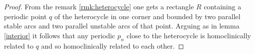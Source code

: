 \documentclass[a4paper,11pt]{article}
\theoremstyle{definition}
\newtheorem{definition}[lemma]{Definition}
\def\la{\lambda}
\begin{document}
\begin{proof} From the remark \ref{rmk:heterocycle} one gets  a rectangle $R$  containing a periodic point $q$ of the heterocycle in one corner and bounded by two parallel stable arcs and two parallel unstable arcs of that point. Arguing  as in lemma \ref{interior} it follows that  any periodic $p_n$ close to the heterocycle is homoclinically related to $q$ and so homoclinically related to each other.



    
\end{proof}



    



    
\end{document}
